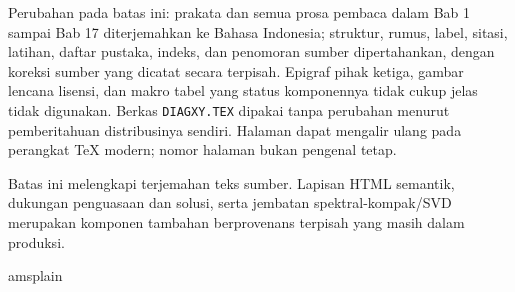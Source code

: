 \documentclass[11pt,reqno]{amsbook}
\theoremstyle{definition}
\theoremstyle{remark}
\numberwithin{equation}{section}
\begin{document}
Perubahan pada batas ini: prakata dan semua prosa pembaca dalam Bab 1 sampai
Bab 17 diterjemahkan ke Bahasa Indonesia; struktur, rumus, label, sitasi,
latihan, daftar pustaka, indeks, dan penomoran sumber dipertahankan, dengan
koreksi sumber yang dicatat secara terpisah. Epigraf pihak ketiga, gambar lencana lisensi, dan makro tabel yang
status komponennya tidak cukup jelas tidak digunakan. Berkas
\texttt{DIAGXY.TEX} dipakai tanpa perubahan menurut pemberitahuan distribusinya
sendiri. Halaman dapat
mengalir ulang pada perangkat TeX modern; nomor halaman bukan pengenal tetap.

Batas ini melengkapi terjemahan teks sumber. Lapisan HTML semantik, dukungan
penguasaan dan solusi, serta jembatan spektral-kompak/SVD merupakan komponen
tambahan berprovenans terpisah yang masih dalam produksi.


\vfill\eject

\tableofcontents


 

 \cleardoublepage


\mainmatter




 
 
 
 
 
 
 
 
 
 
 
 
 
 
 
 
 






\backmatter


 \clearpage
  {amsplain}
 


 \cleardoublepage
 \printindex
\end{document}

